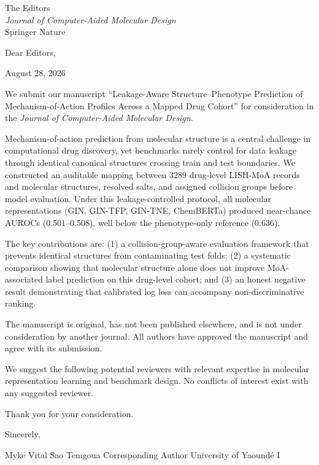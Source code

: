\documentclass[11pt,a4paper]{letter}
\begin{document}
\begin{letter}{%
  The Editors \\
  \textit{Journal of Computer-Aided Molecular Design} \\
  Springer Nature
}

Dear Editors,

\noindent August 28, 2026

We submit our manuscript ``Leakage-Aware Structure--Phenotype Prediction of Mechanism-of-Action Profiles Across a Mapped Drug Cohort'' for consideration in the \textit{Journal of Computer-Aided Molecular Design}.

Mechanism-of-action prediction from molecular structure is a central challenge in computational drug discovery, yet benchmarks rarely control for data leakage through identical canonical structures crossing train and test boundaries. We constructed an auditable mapping between \num{3289} drug-level LISH-MoA records and molecular structures, resolved salts, and assigned collision groups before model evaluation. Under this leakage-controlled protocol, all molecular representations (GIN, GIN-TFP, GIN-TNE, ChemBERTa) produced near-chance AUROCs (\num{0.501}--\num{0.508}), well below the phenotype-only reference (\num{0.636}).

The key contributions are: (1) a collision-group-aware evaluation framework that prevents identical structures from contaminating test folds; (2) a systematic comparison showing that molecular structure alone does not improve MoA-associated label prediction on this drug-level cohort; and (3) an honest negative result demonstrating that calibrated log loss can accompany non-discriminative ranking.

The manuscript is original, has not been published elsewhere, and is not under consideration by another journal. All authors have approved the manuscript and agree with its submission.

We suggest the following potential reviewers with relevant expertise in molecular representation learning and benchmark design. No conflicts of interest exist with any suggested reviewer.

Thank you for your consideration.

Sincerely,

Myke Vital Sao Temgoua
Corresponding Author
University of Yaound\'e I

\end{letter}
\end{document}

